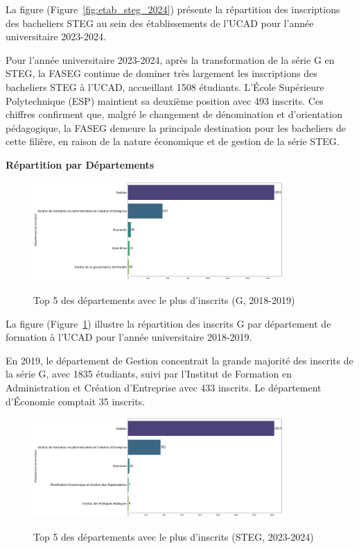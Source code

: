 La figure (Figure~\ref{fig:etab_steg_2024}) présente la répartition des inscriptions des bacheliers STEG au sein des établissements de l'UCAD pour l'année universitaire 2023-2024.

Pour l'année universitaire 2023-2024, après la transformation de la série G en STEG, la FASEG continue de dominer très largement les inscriptions des bacheliers STEG à l'UCAD, accueillant 1508 étudiants. 
L'École Supérieure Polytechnique (ESP) maintient sa deuxième position avec 493 inscrits. Ces chiffres confirment que, malgré le changement de dénomination et d'orientation pédagogique, la FASEG demeure la principale destination pour les bacheliers de cette filière, en raison de la nature économique et de gestion de la série STEG. 

\textbf{Répartition par Départements}

\begin{figure}[ht]
\centering
\caption{Top 5 des départements avec le plus d'inscrits (G, 2018-2019)}
\includegraphics[width=0.85\textwidth]{figure/dep_G_2019.png}
\label{fig:dep_g_2019}
\end{figure}

La figure (Figure~\ref{fig:dep_g_2019}) illustre la répartition des inscrits G par département de formation à l'UCAD pour l'année universitaire 2018-2019.

En 2019, le département de Gestion concentrait la grande majorité des inscrits de la série G, avec 1835 étudiants, suivi par l'Institut de Formation en Administration et Création d'Entreprise avec 433 inscrits. Le département d'Économie comptait 35 inscrits.


\begin{figure}[ht]
\centering
\caption{Top 5 des départements avec le plus d'inscrits (STEG, 2023-2024)}
\includegraphics[width=0.85\textwidth]{figure/dep_STEG_2024.png}
\label{fig:dep_steg_2024}
\end{figure}

